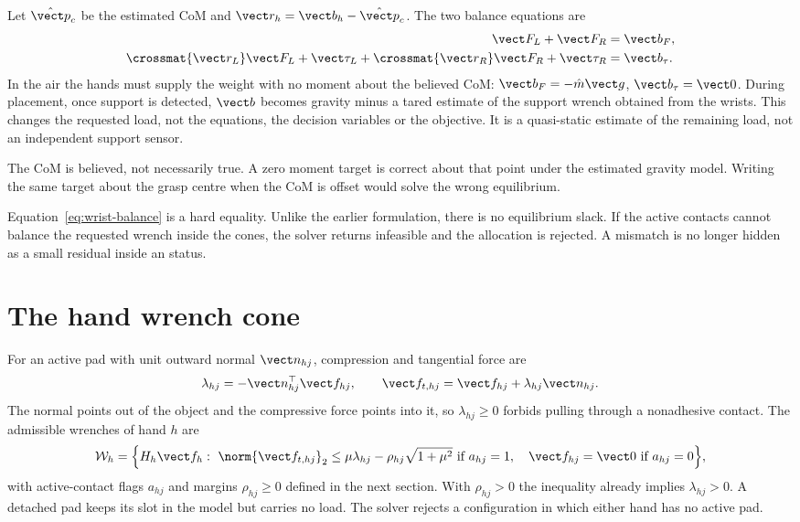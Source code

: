 Let $\hat{\vect p}_c$ be the estimated CoM and $\vect r_h=\vect b_h-\hat{\vect p}_c$. The two balance equations are
\begin{align}
\vect F_L+\vect F_R&=\vect b_F,\nonumber\\
\crossmat{\vect r_L}\vect F_L+\vect\tau_L+\crossmat{\vect r_R}\vect F_R+\vect\tau_R&=\vect b_\tau.
\label{eq:wrist-balance}
\end{align}
In the air the hands must supply the weight with no moment about the believed CoM: $\vect b_F=-\hat m\vect g$, $\vect b_\tau=\vect 0$. During placement, once support is detected, $\vect b$ becomes gravity minus a tared estimate of the support wrench obtained from the wrists. This changes the requested load, not the equations, the decision variables or the objective. It is a quasi-static estimate of the remaining load, not an independent support sensor.

The CoM is believed, not necessarily true. A zero moment target is correct about that point under the estimated gravity model. Writing the same target about the grasp centre when the CoM is offset would solve the wrong equilibrium.

Equation~\eqref{eq:wrist-balance} is a hard equality. Unlike the earlier formulation, there is no equilibrium slack. If the active contacts cannot balance the requested wrench inside the cones, the solver returns infeasible and the allocation is rejected. A mismatch is no longer hidden as a small residual inside an  status.

\section{The hand wrench cone}

For an active pad with unit outward normal $\vect n_{hj}$, compression and tangential force are
\begin{equation}
\lambda_{hj}=-\vect n_{hj}^\top\vect f_{hj},\qquad
\vect f_{t,hj}=\vect f_{hj}+\lambda_{hj}\vect n_{hj}.
\label{eq:normal-tangent}
\end{equation}
The normal points out of the object and the compressive force points into it, so $\lambda_{hj}\geq0$ forbids pulling through a nonadhesive contact. The admissible wrenches of hand $h$ are
\begin{equation}
\mathcal W_h=\Bigl\{H_h\vect f_h:\
\norm{\vect f_{t,hj}}_2\leq\mu\lambda_{hj}-\rho_{hj}\sqrt{1+\mu^2}\ \text{if }a_{hj}=1,\quad
\vect f_{hj}=\vect0\ \text{if }a_{hj}=0\Bigr\},
\label{eq:hand-cone}
\end{equation}
with active-contact flags $a_{hj}$ and margins $\rho_{hj}\geq0$ defined in the next section. With $\rho_{hj}>0$ the inequality already implies $\lambda_{hj}>0$. A detached pad keeps its slot in the model but carries no load. The solver rejects a configuration in which either hand has no active pad.


